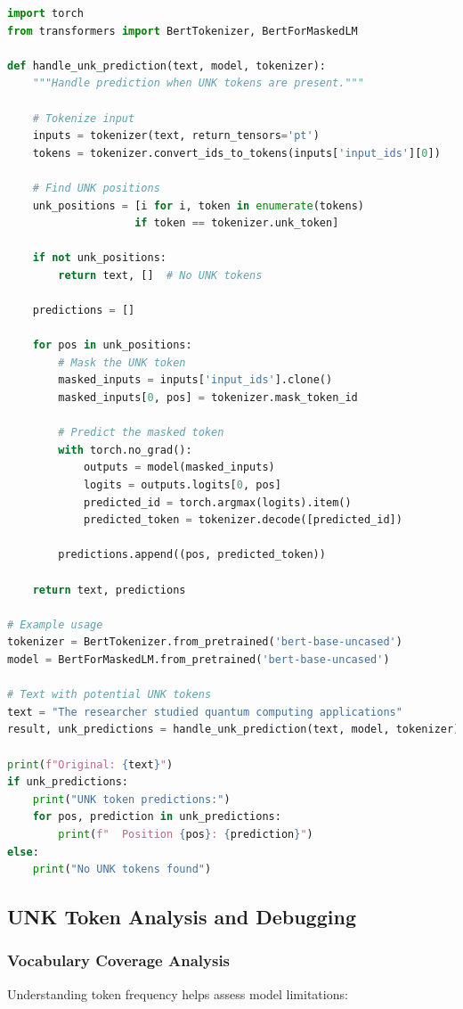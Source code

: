 \begin{lstlisting}[language=Python, caption=UNK Token Handling]
import torch
from transformers import BertTokenizer, BertForMaskedLM

def handle_unk_prediction(text, model, tokenizer):
    """Handle prediction when UNK tokens are present."""
    
    # Tokenize input
    inputs = tokenizer(text, return_tensors='pt')
    tokens = tokenizer.convert_ids_to_tokens(inputs['input_ids'][0])
    
    # Find UNK positions
    unk_positions = [i for i, token in enumerate(tokens) 
                    if token == tokenizer.unk_token]
    
    if not unk_positions:
        return text, []  # No UNK tokens
    
    predictions = []
    
    for pos in unk_positions:
        # Mask the UNK token
        masked_inputs = inputs['input_ids'].clone()
        masked_inputs[0, pos] = tokenizer.mask_token_id
        
        # Predict the masked token
        with torch.no_grad():
            outputs = model(masked_inputs)
            logits = outputs.logits[0, pos]
            predicted_id = torch.argmax(logits).item()
            predicted_token = tokenizer.decode([predicted_id])
            
        predictions.append((pos, predicted_token))
    
    return text, predictions

# Example usage
tokenizer = BertTokenizer.from_pretrained('bert-base-uncased')
model = BertForMaskedLM.from_pretrained('bert-base-uncased')

# Text with potential UNK tokens
text = "The researcher studied quantum computing applications"
result, unk_predictions = handle_unk_prediction(text, model, tokenizer)

print(f"Original: {text}")
if unk_predictions:
    print("UNK token predictions:")
    for pos, prediction in unk_predictions:
        print(f"  Position {pos}: {prediction}")
else:
    print("No UNK tokens found")
\end{lstlisting}

\subsection{UNK Token Analysis and Debugging}

\subsubsection{Vocabulary Coverage Analysis}
Understanding \unk{} token frequency helps assess model limitations:

